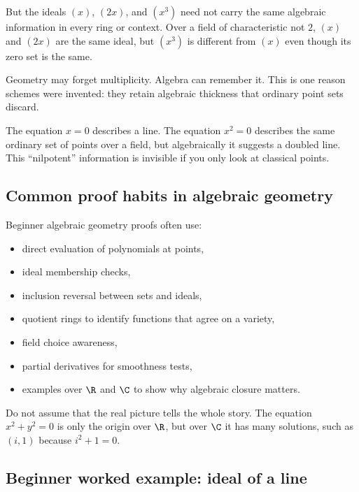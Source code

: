 But the ideals $(x)$, $(2x)$, and $(x^3)$ need not carry the same algebraic
information in every ring or context. Over a field of characteristic not $2$,
$(x)$ and $(2x)$ are the same ideal, but $(x^3)$ is different from $(x)$ even
though its zero set is the same.

\begin{intuitionbox}
Geometry may forget multiplicity. Algebra can remember it. This is one reason
schemes were invented: they retain algebraic thickness that ordinary point sets
discard.
\end{intuitionbox}

\begin{example}
The equation $x=0$ describes a line. The equation $x^2=0$ describes the same
ordinary set of points over a field, but algebraically it suggests a doubled
line. This ``nilpotent'' information is invisible if you only look at classical
points.
\end{example}

\subsection{Common proof habits in algebraic geometry}

Beginner algebraic geometry proofs often use:

\begin{itemize}
\item direct evaluation of polynomials at points,
\item ideal membership checks,
\item inclusion reversal between sets and ideals,
\item quotient rings to identify functions that agree on a variety,
\item field choice awareness,
\item partial derivatives for smoothness tests,
\item examples over $\R$ and $\C$ to show why algebraic closure matters.
\end{itemize}

\begin{trapbox}
Do not assume that the real picture tells the whole story. The equation
$x^2+y^2=0$ is only the origin over $\R$, but over $\C$ it has many solutions,
such as $(i,1)$ because $i^2+1=0$.
\end{trapbox}

\subsection{Beginner worked example: ideal of a line}

